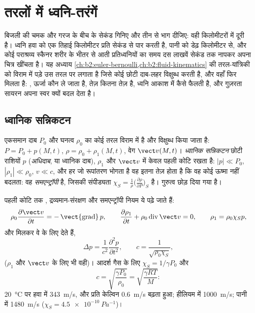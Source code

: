 \chapter{तरलों में ध्वनि-तरंगें}\label{ch:b2:sound-waves}

बिजली की चमक और गरज के बीच के सेकंड गिनिए और तीन से भाग दीजिए: वही
किलोमीटरों में दूरी है। ध्वनि हवा को एक तिहाई किलोमीटर प्रति सेकंड से
पार करती है, पानी को डेढ़ किलोमीटर से, और कोई पराश्रव्य स्कैनर शरीर के
भीतर से आती प्रतिध्वनियों का समय दस लाखवें सेकंड तक नापकर अपना चित्र
खींचता है। यह अध्याय \cref{ch:b2:euler-bernoulli,ch:b2:fluid-kinematics}
की तरल-यांत्रिकी को विराम में पड़े उस तरल पर लगाता है जिसे कोई छोटी
दाब-लहर विक्षुब्ध करती है, और वहाँ  फिर मिलता है: , ऊर्जा कौन ले जाता है, तेज़ कितना तेज़ है, ध्वनि आकाश में कैसे
फैलती है, और गुज़रता सायरन अपना स्वर क्यों बदल देता है।

\section{ध्वानिक सन्निकटन}

\begin{definition}[ध्वानिक विक्षोभ]\label{def:b2:sound-waves:approximation}
एकसमान दाब $P_0$ और घनत्व $\rho_0$ का कोई तरल विराम में है और
विक्षुब्ध किया जाता है: $P = P_0 + p(M, t)$, $\rho = \rho_0 + \rho_1(M, t)$, वेग
$\vect v(M, t)$। \emph{ध्वानिक सन्निकटन} छोटी राशियों $p$
(\emph{अधिदाब}, या ध्वानिक दाब), $\rho_1$ और $\vect v$ में केवल पहली
कोटि रखता है: $|p| \ll P_0$, $|\rho_1| \ll \rho_0$, $v \ll c$,
और हर  जो रूपांतरण भोगता है वह इतना तेज़ होता है
कि वह कोई ऊष्मा नहीं बदलता: वह \emph{समएन्ट्रॉपी} है, जिसकी
संपीड्यता $\chi_S = \frac1\rho\bigl(\frac{\partial\rho}{\partial P}\bigr)_S$ है।
गुरुत्व छोड़ दिया गया है।
\end{definition}

\begin{theorem}[ध्वनि-तरंगें]\label{thm:b2:sound-waves:equation}
पहली कोटि तक , द्रव्यमान-संरक्षण और समएन्ट्रॉपी
नियम ये पढ़े जाते हैं:
\[
\rho_0\frac{\partial\vect v}{\partial t} = -\operatorname{\vect{grad}}p , \qquad
\frac{\partial\rho_1}{\partial t} + \rho_0\operatorname{div}\vect v = 0 , \qquad
\rho_1 = \rho_0\chi_Sp ,
\]
और मिलकर वे  के लिए  देते हैं,
\[
\Delta p = \frac1{c^2}\frac{\partial^2p}{\partial t^2} , \qquad
c = \frac1{\sqrt{\rho_0\chi_S}} ,
\]
($\rho_1$ और $\vect v$ के लिए भी वही)। आदर्श गैस के लिए $\chi_S =
1/\gamma P_0$ और
\[
c = \sqrt{\frac{\gamma P_0}{\rho_0}} = \sqrt{\frac{\gamma RT}{M}} :
\]
\qty{20}{\degreeCelsius} पर हवा में \qty{343}{m/s}, और प्रति केल्विन
\qty{0.6}{m/s} बढ़ता हुआ; हीलियम में \qty{1000}{m/s}; पानी में \qty{1480}{m/s} ($\chi_S =
\qty{4.5e-10}{Pa^{-1}}$)।
\end{theorem}

